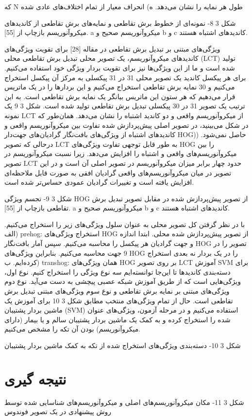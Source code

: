 که N طول هر نمایه را نشان می‌دهد.
	ه) انحراف معیار از تمام اختلاف‌های عادی شده


 
شکل ‏3 8- نمونه‌ای از خطوط برش تقاطعی و نمایه‌های برش تقاطعی از کاندید‌های میکروآنوریسم بازچاپ از [55]. a میکروآنوریسم صحیح و b و c کاندید‌های اشتباه هستند.

	ویژگی‌های مبتنی بر تبدیل برش تقاطعی
در مقاله [28] برای تقویت ویژگی‌های کاندیدهای میکروآنوریسم، یک تصویر محلی تبدیل برش تقاطعی محلی (LCT)  تولید شده است و ما از این ویژگی‌ها نیز برای تقویت بردار ویژگی خود استفاده می‌کنیم.
برای هر پیکسل کاندید یک تصویر محلی 31 در 31 پیکسلی به مرکز آن پیکسل استخراج می‌کنیم و 30 نمایه برش تقاطعی استخراج می‌کنیم و این بردارها را در یک ماتریس قرار می‌دهیم که هر ستون این ماتریس بیانگر یک نمایه برش تقاطعی است. به این ترتیب یک تصویر 31 در 30 پیکسلی تبدیل برش تقاطعی تولید شده است. شکل ‏3 9 یک نمونه LCT از میکروآنوریسم واقعی و دو کاندید اشتباه را نشان می‌دهد. همان‌طور که در شکل می‌بینید، در تصویر اصلی پیش‌پردازش شده تفاوت بین میکروآنوریسم واقعی و کاندیدهای اشتباه از ویژگی‌های بافت‌نگار گرادیان‌های جهت‌دار  HOG)) حاصل نمی‌شود. درحالی که تصویر LCT به طور قابل توجهی تفاوت ویژگی‌های HOG را بین میکروآنوریسم‌های واقعی و اشتباه را افزایش می‌دهد. زیرا نسبت میکروآنوریسم در تصویر LCT حدود چهار برابر میزان میکروآنوریسم در تصویر اصلی آن است و در این تصویر در میان میکروآنوریسم‌های واقعی گرادیان افقی به صورت قابل ملاحظه‌ای افزایش یافته است و تغییرات گرادیان عمودی حساس‌تر شده است.
 
شکل ‏3 9- تجسم ویژگی HOG  از تصویر پیش‌پردازش شده در مقابل تصویر تبدیل برش تقاطعی بازچاپ از [55]. a میکروآنوریسم صحیح و b و c کاندیدهای اشتباه هستند.

با در نظر گرفتن کل تصویر محلی به عنوان سلول ویژگی‌های زیر را استخراج می‌کنیم.
الف) prehog: استخراج ویژگی‌های HOG از تصویر پیش‌پردازش شده محلی. ابتدا اندازه و جهت گرادیان هر پیکسل را محاسبه می‌کنیم. سپس آمار بافت‌نگار HOG تصویر را در 9 جهت محاسبه می‌کنیم. بنابراین ویژگی‌های HOG را در یک بردار نه بعدی استخراج کرده‌ایم.
ب) transhog: همان ویژگی‌های HOG بر روی تصویر LCT
	آموزش SVM برای دسته‌بندی کاندیدها
تا این‌جا توانسته‌ایم سه نوع ویژگی را استخراج کنیم. نوع اول، ویژگی‌هایی است که از طریق آموزش شبکه عصبی پیچشی به دست می‌آید. نوع دوم ویژگی‌های مبتنی بر نمایه برش تقاطعی و نوع سوم ویژگی‌های مبتنی تبدیل برش تقاطعی است. حال از تمام ویژگی‌های منتخب مطابق شکل ‏3 10 برای آموزش یک ماشین بردار پشتیبان (SVM) استفاده می‌کنیم و در مرحله آزمون، ویژگی‌های عنوان شده را استخراج کرده و به کمک یک ماشین بردار پشتیبان سالم و یا بیمار (دارای میکروآنوریسم) بودن آن تکه را مشخص می‌کنیم. 


 
شکل ‏3 10- دسته‌بندی ویژگی‌های استخراج شده از تکه به کمک ماشین بردار پشتیبان

\section{نتیجه گیری}

 
شکل ‏3 11- مکان میکروآنوریسم‌های اصلی و میکروآنوریسم‌های شناسایی شده توسط روش پیشنهادی در یک تصویر فوندوس